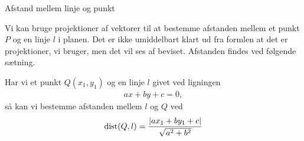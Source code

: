 \begin{center}
\Huge
Afstand mellem linje og punkt
\end{center}

Vi kan bruge projektioner af vektorer til at bestemme afstanden mellem et punkt $P$ og en linje $l$ i planen. Det er ikke umiddelbart klart ud fra formlen at det er projektioner, vi bruger, men det vil ses af beviset. Afstanden findes ved følgende sætning. 

\begin{setn}
Har vi et punkt $Q(x_1,y_1)$ og en linje $l$ givet ved ligningen
\begin{align*}
ax+by+c = 0, 
\end{align*}
så kan vi bestemme afstanden mellem $l$ og $Q$ ved
\begin{align*}
\textnormal{dist}(Q,l) = \frac{|ax_1+by_1+c|}{\sqrt{a^2+b^2}}
\end{align*}
\end{setn}
